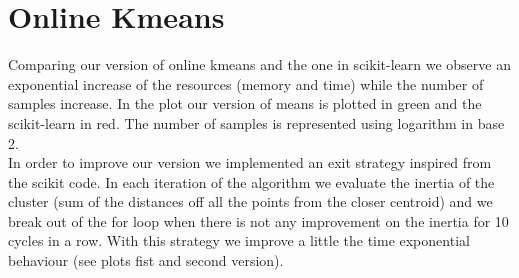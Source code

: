 \documentclass[12pt]{article}
\begin{document}
\section{Online Kmeans}
Comparing our version of online kmeans and the one in scikit-learn we observe an exponential increase of the resources (memory and time) while the number of samples increase. In the plot our version of means is plotted in green and the scikit-learn in red. The number of samples is represented using logarithm in base 2.\\
In order to improve our version we implemented an exit strategy inspired from the scikit code. In each iteration of the algorithm we evaluate the inertia of the cluster (sum of the distances off all the points from the closer centroid) and we break out of the for loop when there is not any improvement on the inertia for 10 cycles in a row. With this strategy we improve a little the time exponential behaviour (see plots fist and second version).
\end{document}
